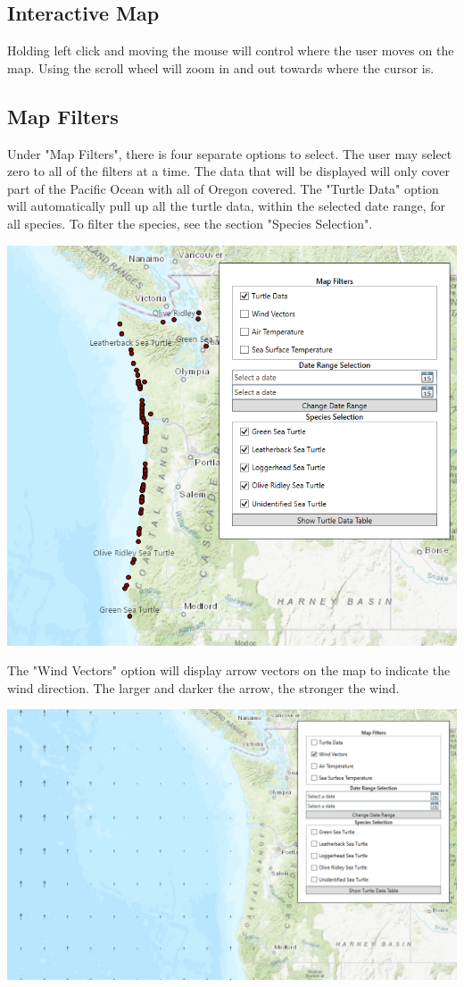 \documentclass[onecolumn, draftclsnofoot,10pt, compsoc]{IEEEtran}
\begin{document}
\subsection{Interactive Map}
Holding left click and moving the mouse will control where the user moves on the map. Using the scroll wheel will zoom in and out towards where the cursor is.

\subsection{Map Filters}
Under "Map Filters", there is four separate options to select. The user may select zero to all of the filters at a time. The data that will be displayed will only cover part of the Pacific Ocean with all of Oregon covered. 
\newline The "Turtle Data" option will automatically pull up all the turtle data, within the selected date range, for all species. To filter the species, see the section "Species Selection". 
\newline \begin{center}\includegraphics[width=0.5 \textwidth]{images/turtle-data.PNG}\end{center}
The "Wind Vectors" option will display arrow vectors on the map to indicate the wind direction. The larger and darker the arrow, the stronger the wind. 
\newline \begin{center}\includegraphics[width=0.5 \textwidth]{images/wind-vector.PNG}\end{center}
\end{document}

